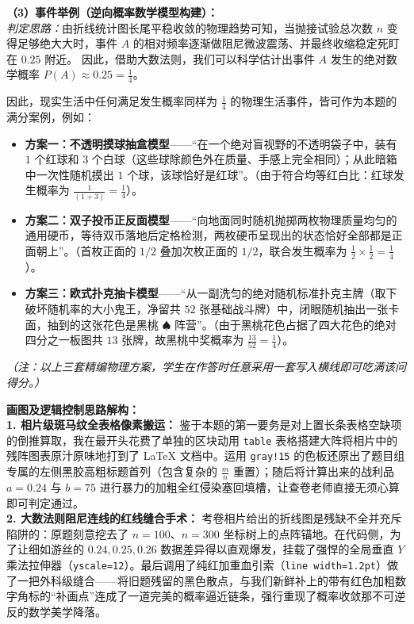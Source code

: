 \vspace{0.4cm}
\textbf{（3）事件举例（逆向概率数学模型构建）：} \\
\textit{判定思路：}由折线统计图长尾平稳收敛的物理趋势可知，当抛接试验总次数 $n$ 变得足够绝大大时，事件 $A$ 的相对频率逐渐做阻尼微波震荡、并最终收缩稳定死盯在 $0.25$ 附近。
因此，借助大数法则，我们可以科学估计出事件 $A$ 发生的绝对数学概率 $P(A) \approx 0.25 = \frac{1}{4}$。

因此，现实生活中任何满足发生概率同样为 $\frac{1}{4}$ 的物理生活事件，皆可作为本题的满分案例，例如：
\begin{itemize}
    \item \textbf{方案一：不透明摸球抽盒模型}——“在一个绝对盲视野的不透明袋子中，装有 $1$ 个红球和 $3$ 个白球（这些球除颜色外在质量、手感上完全相同）；从此暗箱中一次性随机摸出 $1$ 个球，该球恰好是红球”。（由于符合均等红白比：红球发生概率为 $\frac{1}{(1+3)} = \frac{1}{4}$）。
    \item \textbf{方案二：双子投币正反面模型}——“向地面同时随机抛掷两枚物理质量均匀的通用硬币，等待双币落地后定格检测，两枚硬币呈现出的状态恰好全部都是正面朝上”。（首枚正面的 $1/2$ 叠加次枚正面的 $1/2$，联合发生概率为 $\frac{1}{2} \times \frac{1}{2} = \frac{1}{4}$）。
    \item \textbf{方案三：欧式扑克抽卡模型}——“从一副洗匀的绝对随机标准扑克主牌（取下破坏随机率的大小鬼王，净留共 $52$ 张基础战斗牌）中，闭眼随机抽出一张卡面，抽到的这张花色是黑桃 $\spadesuit$ 阵营”。（由于黑桃花色占据了四大花色的绝对四分之一板图共 $13$ 张牌，故黑桃中奖概率为 $\frac{13}{52} = \frac{1}{4}$）。
\end{itemize}
\textit{（注：以上三套精编物理方案，学生在作答时任意采用一套写入横线即可吃满该问得分。）}

\vspace{0.4cm}
{\small\color{blue!70!black}
\textbf{画图及逻辑控制思路解构：}\\
\textbf{1. 相片级斑马纹全表格像素搬运：} 鉴于本题的第一要务是对上置长条表格空缺项的倒推算取，我在最开头花费了单独的区块动用 \texttt{table} 表格搭建大阵将相片中的残阵图表原汁原味地打到了 LaTeX 文档中。运用 \texttt{gray!15} 的色板还原出了题目组专属的左侧黑胶高粗标题首列（包含复杂的 $\frac{m}{n}$ 重置）；随后将计算出来的战利品 $a=0.24$ 与 $b=75$ 进行暴力的加粗全红侵染塞回填槽，让查卷老师直接无须心算即可判定通过。\\
\textbf{2. 大数法则阻尼连线的红线缝合手术：} 考卷相片给出的折线图是残缺不全并充斥陷阱的：原题刻意挖去了 $n=100$、$n=300$ 坐标树上的点阵锚地。在代码侧，为了让细如游丝的 $0.24, 0.25, 0.26$ 数据差异得以直观爆发，挂载了强悍的全局垂直 $Y$ 乘法拉伸器（\texttt{yscale=12}）。最后调用了纯红加重血引索（\texttt{line width=1.2pt}）做了一把外科级缝合——将旧题残留的黑色散点，与我们新鲜补上的带有红色加粗数字角标的“补画点”连成了一道完美的概率逼近链条，强行重现了概率收敛那不可逆反的数学美学降落。
}

